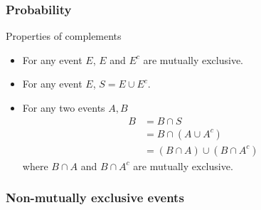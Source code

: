\documentclass[handout]{beamer}
\begin{document}
   \begin{frame} \frametitle{Probability}

   \begin{block}
   {Properties of complements}
   \begin{itemize}
   \item For any event $E$, $E$ and $E^c$ are mutually exclusive.
   \item For any event $E$, $S = E \cup E^c$.
   \item For any two events $A, B$
   $$
   \begin{aligned}
   B &= B \cap S \\
   &=   B \cap (A \cup A^c) \\
   &=   (B \cap A) \cup (B \cap A^c)
   \end{aligned}
   $$
   where $B \cap A$ and $B \cap A^c$ are mutually exclusive.
   \end{itemize}
   \end{block}
   \end{frame}



   \begin{frame}
   \frametitle{Non-mutually exclusive events}
   \begin{center}
   \end{center}

   \end{frame}

\end{document}
